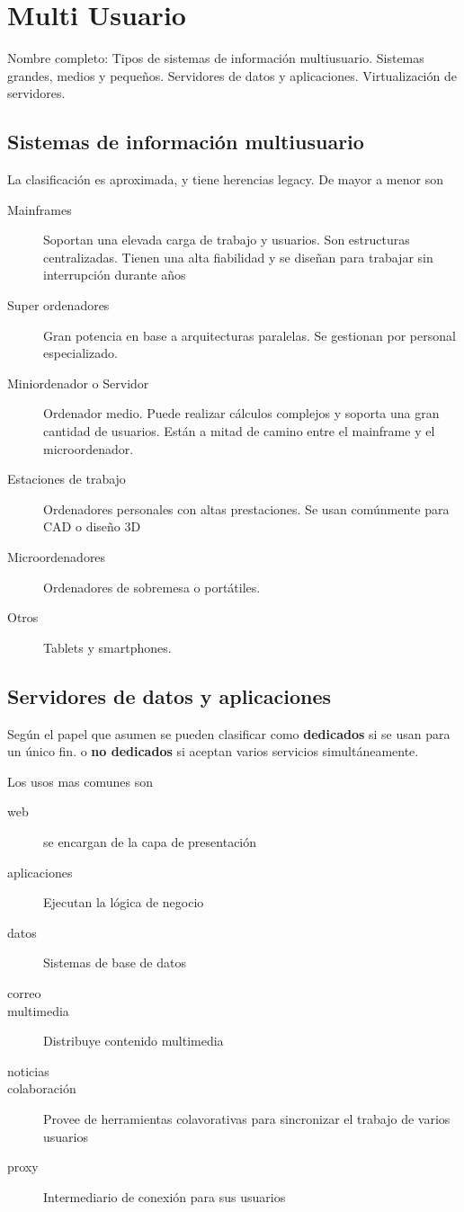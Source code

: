 \setcounter{section}{56} %
\section{Multi Usuario}

Nombre completo: Tipos de sistemas de información multiusuario. Sistemas grandes, medios y pequeños. Servidores de datos y aplicaciones. Virtualización de servidores.

\localtableofcontents

\subsection{Sistemas de información multiusuario}
La clasificación es aproximada, y tiene herencias legacy. De mayor a menor son

\begin{description}
    \item[Mainframes] Soportan una elevada carga de trabajo y usuarios. Son estructuras centralizadas. Tienen una alta fiabilidad y se diseñan para trabajar sin interrupción durante años
    \item[Super ordenadores] Gran potencia en base a arquitecturas paralelas. Se gestionan por personal especializado.
    \item[Miniordenador o Servidor] Ordenador medio. Puede realizar cálculos complejos y soporta una gran cantidad de usuarios. Están a mitad de camino entre el mainframe y el microordenador.
    \item[Estaciones de trabajo] Ordenadores personales con altas prestaciones. Se usan comúnmente para CAD o diseño 3D
    \item[Microordenadores] Ordenadores de sobremesa o portátiles.
    \item[Otros] Tablets y smartphones.
\end{description}

\subsection{Servidores de datos y aplicaciones}
Según el papel que asumen se pueden clasificar como \textbf{dedicados} si se usan para un único fin. o \textbf{no dedicados} si aceptan varios servicios simultáneamente.

Los usos mas comunes son
\begin{description}
    \item[web] se encargan de la capa de presentación
    \item[aplicaciones] Ejecutan la lógica de negocio
    \item[datos] Sistemas de base de datos
    \item[correo]
    \item[multimedia] Distribuye contenido multimedia
    \item[noticias]
    \item[colaboración] Provee de herramientas colavorativas para sincronizar el trabajo de varios usuarios
    \item[proxy] Intermediario de conexión para sus usuarios
\end{description}

